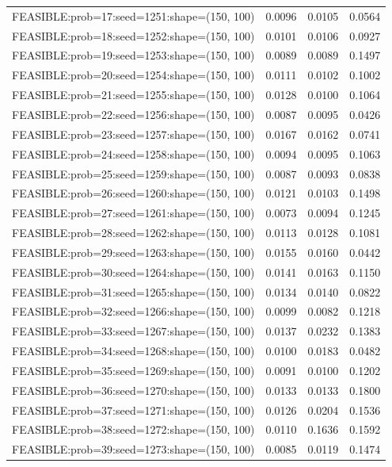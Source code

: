 \begin{longtable}{lccc}
FEASIBLE:prob=17:seed=1251:shape=(150, 100)  & 0.0096 & 0.0105 & 0.0564 \\
FEASIBLE:prob=18:seed=1252:shape=(150, 100)  & 0.0101 & 0.0106 & 0.0927 \\
FEASIBLE:prob=19:seed=1253:shape=(150, 100)  & 0.0089 & 0.0089 & 0.1497 \\
FEASIBLE:prob=20:seed=1254:shape=(150, 100)  & 0.0111 & 0.0102 & 0.1002 \\
FEASIBLE:prob=21:seed=1255:shape=(150, 100)  & 0.0128 & 0.0100 & 0.1064 \\
FEASIBLE:prob=22:seed=1256:shape=(150, 100)  & 0.0087 & 0.0095 & 0.0426 \\
FEASIBLE:prob=23:seed=1257:shape=(150, 100)  & 0.0167 & 0.0162 & 0.0741 \\
FEASIBLE:prob=24:seed=1258:shape=(150, 100)  & 0.0094 & 0.0095 & 0.1063 \\
FEASIBLE:prob=25:seed=1259:shape=(150, 100)  & 0.0087 & 0.0093 & 0.0838 \\
FEASIBLE:prob=26:seed=1260:shape=(150, 100)  & 0.0121 & 0.0103 & 0.1498 \\
FEASIBLE:prob=27:seed=1261:shape=(150, 100)  & 0.0073 & 0.0094 & 0.1245 \\
FEASIBLE:prob=28:seed=1262:shape=(150, 100)  & 0.0113 & 0.0128 & 0.1081 \\
FEASIBLE:prob=29:seed=1263:shape=(150, 100)  & 0.0155 & 0.0160 & 0.0442 \\
FEASIBLE:prob=30:seed=1264:shape=(150, 100)  & 0.0141 & 0.0163 & 0.1150 \\
FEASIBLE:prob=31:seed=1265:shape=(150, 100)  & 0.0134 & 0.0140 & 0.0822 \\
FEASIBLE:prob=32:seed=1266:shape=(150, 100)  & 0.0099 & 0.0082 & 0.1218 \\
FEASIBLE:prob=33:seed=1267:shape=(150, 100)  & 0.0137 & 0.0232 & 0.1383 \\
FEASIBLE:prob=34:seed=1268:shape=(150, 100)  & 0.0100 & 0.0183 & 0.0482 \\
FEASIBLE:prob=35:seed=1269:shape=(150, 100)  & 0.0091 & 0.0100 & 0.1202 \\
FEASIBLE:prob=36:seed=1270:shape=(150, 100)  & 0.0133 & 0.0133 & 0.1800 \\
FEASIBLE:prob=37:seed=1271:shape=(150, 100)  & 0.0126 & 0.0204 & 0.1536 \\
FEASIBLE:prob=38:seed=1272:shape=(150, 100)  & 0.0110 & 0.1636 & 0.1592 \\
FEASIBLE:prob=39:seed=1273:shape=(150, 100)  & 0.0085 & 0.0119 & 0.1474 \\

\end{longtable}
